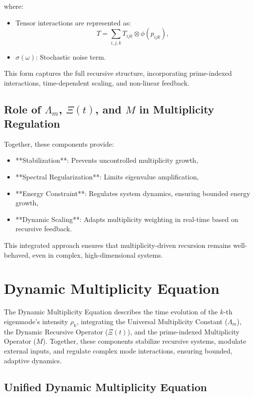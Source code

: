 \documentclass[12pt]{article}
\theoremstyle{plain}
\begin{document}
where:
\begin{itemize}
    \item Tensor interactions are represented as:
    \[
    T = \sum_{i,j,k} T_{ijk} \otimes \phi(p_{ijk}),
    \]
    \item \( \sigma(\omega) \): Stochastic noise term.
\end{itemize}

This form captures the full recursive structure, incorporating prime-indexed interactions, time-dependent scaling, and non-linear feedback.

\subsection{Role of \(\Lambda_m\), \(\Xi(t)\), and \(M\) in Multiplicity Regulation}

Together, these components provide:

\begin{itemize}
    \item **Stabilization**: Prevents uncontrolled multiplicity growth,
    \item **Spectral Regularization**: Limits eigenvalue amplification,
    \item **Energy Constraint**: Regulates system dynamics, ensuring bounded energy growth,
    \item **Dynamic Scaling**: Adapts multiplicity weighting in real-time based on recursive feedback.
\end{itemize}

This integrated approach ensures that multiplicity-driven recursion remains well-behaved, even in complex, high-dimensional systems.

\section{Dynamic Multiplicity Equation}

The Dynamic Multiplicity Equation describes the time evolution of the \( k \)-th eigenmode’s intensity \( \rho_k \), integrating the Universal Multiplicity Constant (\(\Lambda_m\)), the Dynamic Recursive Operator (\(\Xi(t)\)), and the prime-indexed Multiplicity Operator (\(M\)). Together, these components stabilize recursive systems, modulate external inputs, and regulate complex mode interactions, ensuring bounded, adaptive dynamics.

\subsection{Unified Dynamic Multiplicity Equation}
\end{document}
